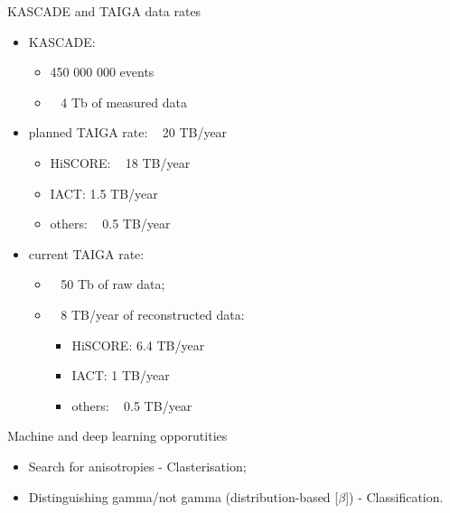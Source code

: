\begin{frame}{KASCADE and TAIGA data rates}
\begin{minipage}[c]{0.52\textwidth}
  \begin{itemize}
    \item KASCADE:
    \begin{itemize}
      \item 450 000 000 events
      \item ~ 4 Tb of measured data
    \end{itemize}
    \vspace{1em}
    \item planned TAIGA rate: ~ 20 TB/year
    \begin{itemize}
      \item HiSCORE: ~ 18 TB/year
      \item IACT: 1.5 TB/year
      \item others: ~ 0.5 TB/year
    \end{itemize}
  \end{itemize}
\end{minipage}
\hfill
\begin{minipage}[c]{0.47\textwidth}
\vspace{-3.5em}
  \begin{itemize}
    \item current TAIGA rate: 
    \begin{itemize}
      \item ~ 50 Tb of raw data;
      \item ~ 8 TB/year of reconstructed data:
      \begin{itemize}
	\item HiSCORE: 6.4 TB/year
	\item IACT: 1 TB/year
	\item others: ~ 0.5 TB/year
      \end{itemize}
    \end{itemize}
  \end{itemize}
\end{minipage}

\end{frame}

\begin{frame}{Machine and deep learning opporutities}
 \begin{itemize}
  \item Search for anisotropies - Clasterisation;
  \item Distinguishing gamma/not gamma (distribution-based [$\beta$]) - Classification.
 \end{itemize}

\end{frame}
